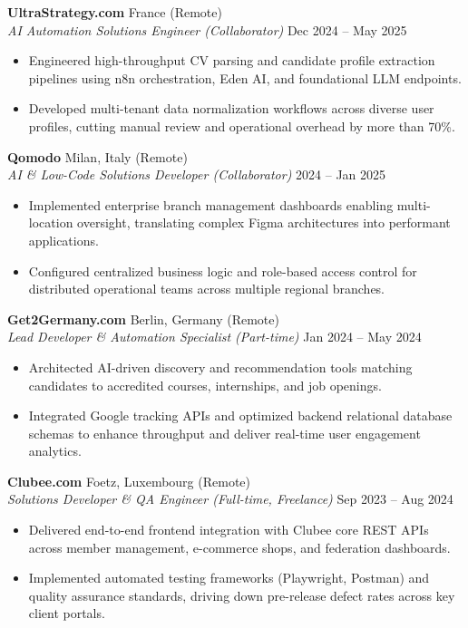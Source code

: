 \documentclass[10pt, a4paper]{article}
\begin{document}
\newpage

\textbf{UltraStrategy.com} \hfill France (Remote)\\
\textit{AI Automation Solutions Engineer (Collaborator)} \hfill Dec 2024 -- May 2025
\begin{itemize}
  \item Engineered high-throughput CV parsing and candidate profile extraction pipelines using n8n orchestration, Eden AI, and foundational LLM endpoints.
  \item Developed multi-tenant data normalization workflows across diverse user profiles, cutting manual review and operational overhead by more than 70\%.
\end{itemize}

\vspace{3pt}
\textbf{Qomodo} \hfill Milan, Italy (Remote)\\
\textit{AI \& Low-Code Solutions Developer (Collaborator)} \hfill 2024 -- Jan 2025
\begin{itemize}
  \item Implemented enterprise branch management dashboards enabling multi-location oversight, translating complex Figma architectures into performant applications.
  \item Configured centralized business logic and role-based access control for distributed operational teams across multiple regional branches.
\end{itemize}

\vspace{3pt}
\textbf{Get2Germany.com} \hfill Berlin, Germany (Remote)\\
\textit{Lead Developer \& Automation Specialist (Part-time)} \hfill Jan 2024 -- May 2024
\begin{itemize}
  \item Architected AI-driven discovery and recommendation tools matching candidates to accredited courses, internships, and job openings.
  \item Integrated Google tracking APIs and optimized backend relational database schemas to enhance throughput and deliver real-time user engagement analytics.
\end{itemize}

\vspace{3pt}
\textbf{Clubee.com} \hfill Foetz, Luxembourg (Remote)\\
\textit{Solutions Developer \& QA Engineer (Full-time, Freelance)} \hfill Sep 2023 -- Aug 2024
\begin{itemize}
  \item Delivered end-to-end frontend integration with Clubee core REST APIs across member management, e-commerce shops, and federation dashboards.
  \item Implemented automated testing frameworks (Playwright, Postman) and quality assurance standards, driving down pre-release defect rates across key client portals.
\end{itemize}
\end{document}
